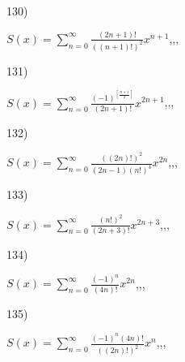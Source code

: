 \documentclass[11pt, ukrainian]{article}
\begin{document}
\par
\vspace{0.9cm}
130) \space 
{%
{$S(x)=\sum\limits_{n=0}^{\infty}{\frac{(2n+1)!}{((n+1)!)^2}}{x^{{n+1}}}$},,, \par \smallskip  
}
\par
\newpage
131) \space 
{%
{$S(x)=\sum\limits_{n=0}^{\infty}{\frac{(-1)^{[\frac{n+1}{2}]}}{(2n+1)!}}{x^{{2n+1}}}$},,, \par \smallskip  
}
\par
\vspace{0.9cm}
132) \space 
{%
{$S(x)=\sum\limits_{n=0}^{\infty}{\frac{((2n)!)^2}{(2n-1)(n!)^4}}{x^{{2n}}}$},,, \par \smallskip  
}
\par
\vspace{0.9cm}
133) \space 
{%
{$S(x)=\sum\limits_{n=0}^{\infty}{\frac{(n!)^2}{(2n+3)!}}{x^{{2n+3}}}$},,, \par \smallskip  
}
\par
\vspace{0.9cm}
134) \space 
{%
{$S(x)=\sum\limits_{n=0}^{\infty}{\frac{(-1)^n}{(4n)!}}{x^{{2n}}}$},,, \par \smallskip  
}
\par
\vspace{0.9cm}
135) \space 
{%
{$S(x)=\sum\limits_{n=0}^{\infty}{\frac{{(-1)^n}(4n)!}{{((2n)!)^2}}}{x^{{n}}}$},,, \par \smallskip  
}
\end{document}
